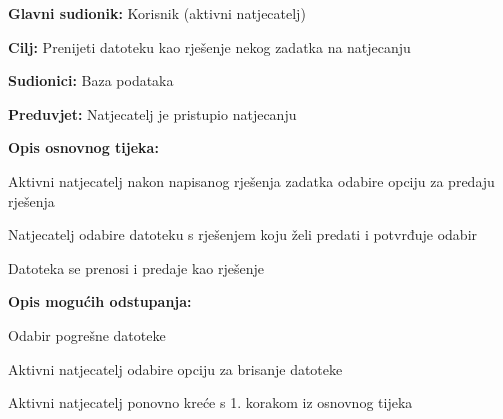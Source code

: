 					\noindent {}
					\begin{packed_item}
						
						\item \textbf{Glavni sudionik: }Korisnik (aktivni natjecatelj)
						\item \textbf{Cilj:} Prenijeti datoteku kao rješenje nekog zadatka na natjecanju
						\item \textbf{Sudionici:} Baza podataka
						\item \textbf{Preduvjet:} Natjecatelj je pristupio natjecanju
						\item \textbf{Opis osnovnog tijeka:}
						
						\item[] \begin{packed_enum}
							\item Aktivni natjecatelj nakon napisanog rješenja zadatka odabire opciju za predaju rješenja
							\item Natjecatelj odabire datoteku s rješenjem koju želi predati i potvrđuje odabir
							\item Datoteka se prenosi i predaje kao rješenje
						\end{packed_enum}
						
							\item  \textbf{Opis mogućih odstupanja:}
							
							\item[] \begin{packed_item}
								
								\item[2.a] Odabir pogrešne datoteke
								\item[] \begin{packed_enum}
									
									\item Aktivni natjecatelj odabire opciju za brisanje datoteke 
									\item Aktivni natjecatelj ponovno kreće s 1. korakom iz osnovnog tijeka
																
								\end{packed_enum}
							\end{packed_item}
						\end{packed_item}
									
									
					
